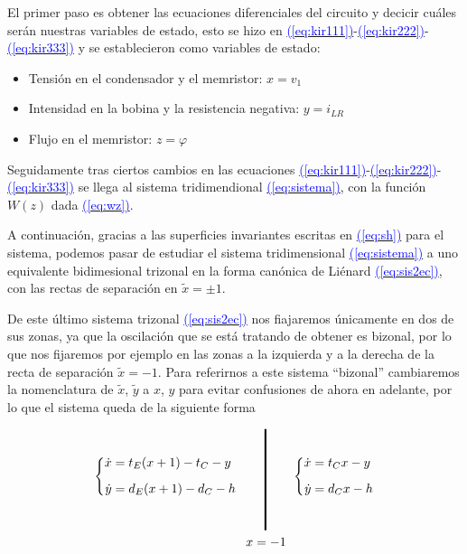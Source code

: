 \documentclass[12pt,a4paper]{report} %
\newcommand{\eref}[1]{\hyperref[#1]{\textcolor{blue}{(\ref*{#1})}}}
\begin{document}
	\vspace{0.5cm} El primer paso es obtener las ecuaciones diferenciales del circuito y decicir cuáles serán nuestras variables de estado, esto se hizo en \eref{eq:kir111}-\eref{eq:kir222}-\eref{eq:kir333} y se establecieron como variables de estado:
	
	\begin{itemize}
		\item Tensión en el condensador y el memristor: $x=v_1$
		\item Intensidad en la bobina y la resistencia negativa: $y=i_{LR}$
		\item Flujo en el memristor: $z=\varphi$
	\end{itemize}
	
	\vspace{0.5cm} Seguidamente tras ciertos cambios en las ecuaciones \eref{eq:kir111}-\eref{eq:kir222}-\eref{eq:kir333} se llega al sistema tridimendional \eref{eq:sistema}, con la función $W(z)$ dada \eref{eq:wz}.
	
	\vspace{0.5cm} A continuación, gracias a las superficies invariantes escritas en \eref{eq:sh} para el sistema, podemos pasar de estudiar el sistema tridimensional \eref{eq:sistema} a uno equivalente bidimesional trizonal en la forma canónica de Liénard \eref{eq:sis2ec}, con las rectas de separación en $\tilde{x}=\pm1$.
	
	\vspace{0.5cm} De este último sistema trizonal \eref{eq:sis2ec} nos fiajaremos únicamente en dos de sus zonas, ya que la oscilación que se está tratando de obtener es bizonal, por lo que nos fijaremos por ejemplo en las zonas a la izquierda y a la derecha de la recta de separación $\tilde{x}=-1$. Para referirnos a este sistema ``bizonal'' cambiaremos la nomenclatura de $\tilde{x}$, $\tilde{y}$ a $x$, $y$ para evitar confusiones de ahora en adelante, por lo que el sistema queda de la siguiente forma
	
	\begin{equation}
		\label{eq:sisbiz}
		\begin{gathered}
			\left\{
			\begin{aligned}
				\dot{x}&=t_E(x+1)-t_C-y
				\\[2mm]
				\dot{y}&=d_E(x+1)-d_C-h
			\end{aligned}
			\right. \qquad 
			\rule[-40pt]{1.5pt}{80pt} \qquad 
			\left\{
			\begin{aligned}
				\dot{x}&=t_Cx-y
				\\[2mm]
				\dot{y}&=d_Cx-h
			\end{aligned}
			\right. \\ \quad\qquad\qquad x=-1
		\end{gathered}
	\end{equation}\smallskip
	
\end{document}
